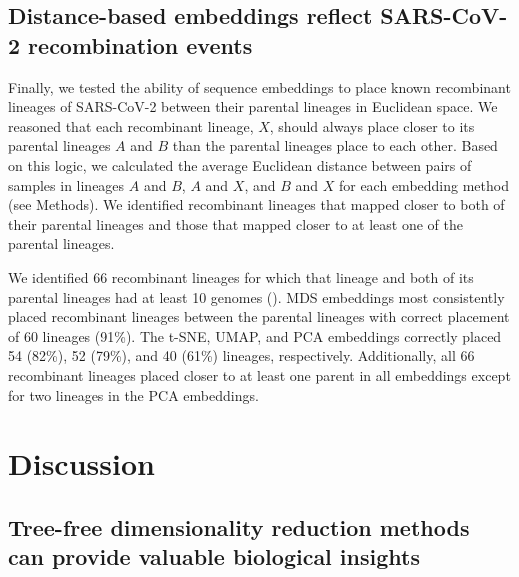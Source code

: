 \documentclass[10pt,letterpaper]{article}
\begin{document}
\subsection*{Distance-based embeddings reflect SARS-CoV-2 recombination events}

Finally, we tested the ability of sequence embeddings to place known recombinant lineages of SARS-CoV-2 between their parental lineages in Euclidean space.
We reasoned that each recombinant lineage, $X$, should always place closer to its parental lineages $A$ and $B$ than the parental lineages place to each other.
Based on this logic, we calculated the average Euclidean distance between pairs of samples in lineages $A$ and $B$, $A$ and $X$, and $B$ and $X$ for each embedding method (see Methods).
We identified recombinant lineages that mapped closer to both of their parental lineages and those that mapped closer to at least one of the parental lineages.

We identified 66 recombinant lineages for which that lineage and both of its parental lineages had at least 10 genomes ().
MDS embeddings most consistently placed recombinant lineages between the parental lineages with correct placement of 60 lineages (91\%).
The t-SNE, UMAP, and PCA embeddings correctly placed 54 (82\%), 52 (79\%), and 40 (61\%) lineages, respectively.
Additionally, all 66 recombinant lineages placed closer to at least one parent in all embeddings except for two lineages in the PCA embeddings.

\section*{Discussion}

\subsection*{Tree-free dimensionality reduction methods can provide valuable biological insights}
\end{document}
